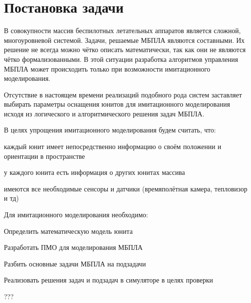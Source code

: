 \section{Постановка задачи}

В совокупности массив беспилотных летательных аппаратов является сложной,
многоуровневой системой. Задачи, решаемые МБПЛА являются составными.
Их решение не всегда можно чётко описать математически, так как они не
являются чётко формализованными.  В этой ситуации разработка алгоритмов
управления МБПЛА может происходить только при возможности имитационного
моделирования.

Отсутствие в настоящем времени реализаций подобного рода систем заставляет
выбирать параметры оснащения юнитов для имитационного моделирования исходя
из логического и алгоритмического решения задач МБПЛА.

В целях упрощения имитационного моделирования будем считать, что:

\begin{mintemize}
\item каждый юнит имеет непосредственно информацию о своём положении и ориентации в пространстве
\item у каждого юнита есть информация о других юнитах массива
\item имеются все необходимые сенсоры и датчики (времяполётная камера, тепловизор и тд)
\end{mintemize}

Для имитационного моделирования необходимо:

\begin{mintemize}
\item Определить математическую модель юнита
\item Разработать ПМО для моделирования МБПЛА
\item Разбить основные задачи МБПЛА на подзадачи
\item Реализовать решения задач и подзадач в симуляторе
      в целях проверки
\end{mintemize}

???
